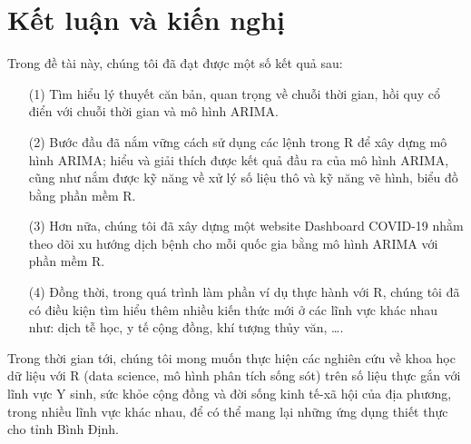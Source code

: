 \documentclass[12pt, a4paper,oneside]{book}
\theoremstyle{definition}
\begin{document}
\chapter*{Kết luận và kiến nghị}
Trong đề tài này, chúng tôi đã đạt được một số kết quả sau: 
\begin{itemize}
	\item[(1)] Tìm hiểu lý thuyết căn bản, quan trọng về chuỗi thời gian, hồi quy cổ điển với chuỗi thời gian và mô hình ARIMA.
	\item[(2)] Bước đầu đã nắm vững cách sử dụng các lệnh trong R để xây dựng mô hình ARIMA; hiểu và giải thích được kết quả đầu ra của mô hình ARIMA, cũng như nắm được kỹ năng về xử lý số liệu thô và kỹ năng vẽ hình, biểu đồ bằng phần mềm R.
	\item[(3)] Hơn nữa, chúng tôi đã xây dựng một website Dashboard COVID-19 nhằm theo dõi xu hướng dịch bệnh cho mỗi quốc gia bằng mô hình ARIMA với phần mềm R.
	\item[(4)] Đồng thời, trong quá trình làm phần ví dụ thực hành với R, chúng tôi đã có điều kiện tìm hiểu thêm nhiều kiến thức mới ở các lĩnh vực khác nhau như: dịch tễ học, y tế cộng đồng, khí tượng thủy văn, \dots.
\end{itemize}
Trong thời gian tới, chúng tôi mong muốn thực hiện các nghiên cứu về khoa học dữ liệu với R (data science, mô hình phân tích sống sót) trên số liệu thực gắn với lĩnh vực Y sinh, sức khỏe cộng đồng và đời sống kinh tế-xã hội của địa phương, trong nhiều lĩnh vực khác nhau, để có thể mang lại những ứng dụng thiết thực cho tỉnh Bình Định.
\end{document}
